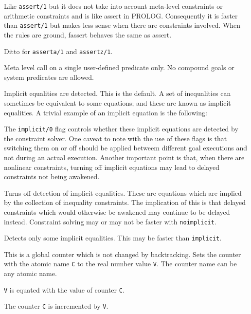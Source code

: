 \begin{description}
Like {\tt assert/1} but it does not take into account meta-level
constraints or arithmetic constraints and is like assert in PROLOG.
Consequently it is faster than {\tt assert/1} but makes less sense
when there are constraints involved.
When the rules are ground, fassert behaves the same as assert.

  
 
Ditto for {\tt asserta/1} and {{\tt assertz/1}}.

\chgbarbegin
{} 
Meta level call on a single user-defined predicate only.
No compound goals or system predicates are allowed.
\chgbarend

 
Implicit equalities are detected. This is the default.
A set of inequalities can sometimes be equivalent to some equations;
and these are known as implicit equalities. A trivial example of an
implicit equation is the following:


The {\tt implicit/0} flag controls whether these implicit equations
are detected by the constraint solver.
One caveat to note with the use of these flags is that switching them
on or off should be applied betweem different goal executions and not
during an actual execution.
Another important point is that, when there are nonlinear constraints,
turning off implicit equations may lead to delayed constraints
not being awakened.

 
Turns off detection of implicit equalities. These are equations
which are implied by the collection of inequality constraints.
The implication of this is that delayed constraints which would otherwise
be awakened may continue to be delayed instead.
Constraint solving may or may not be faster with {\tt noimplicit}.

 
Detects only some implicit equalities. This may be
faster than {\tt implicit}.

\chgbarbegin
{} 
This is a global counter which is not changed by backtracking.
Sets the counter with the atomic name {\tt C} to the real number
value {\tt V}. The counter name can be any atomic name.

 
{\tt V} is equated with the value of counter {\tt C}.

 
The counter {\tt C} is incremented by {\tt V}.
\chgbarend
\end{description}


